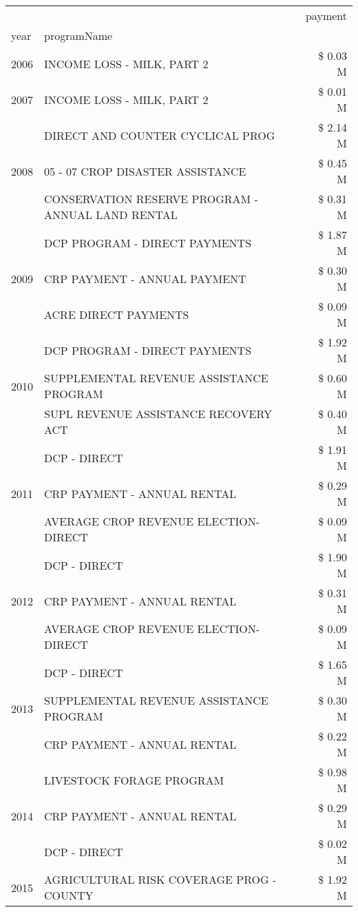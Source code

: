 \begin{tabular}{llr}
\toprule
 &  & payment \\
year & programName &  \\
\midrule
2006 & INCOME LOSS - MILK, PART 2 & \$ 0.03 M \\
\cline{1-3}
2007 & INCOME LOSS - MILK, PART 2 & \$ 0.01 M \\
\cline{1-3}
\multirow[t]{3}{*}{2008} & DIRECT AND COUNTER CYCLICAL PROG & \$ 2.14 M \\
 & 05 - 07 CROP DISASTER ASSISTANCE & \$ 0.45 M \\
 & CONSERVATION RESERVE PROGRAM - ANNUAL LAND RENTAL & \$ 0.31 M \\
\cline{1-3}
\multirow[t]{3}{*}{2009} & DCP PROGRAM - DIRECT PAYMENTS & \$ 1.87 M \\
 & CRP PAYMENT - ANNUAL PAYMENT & \$ 0.30 M \\
 & ACRE DIRECT PAYMENTS & \$ 0.09 M \\
\cline{1-3}
\multirow[t]{3}{*}{2010} & DCP PROGRAM - DIRECT PAYMENTS & \$ 1.92 M \\
 & SUPPLEMENTAL REVENUE ASSISTANCE PROGRAM & \$ 0.60 M \\
 & SUPL REVENUE ASSISTANCE RECOVERY ACT & \$ 0.40 M \\
\cline{1-3}
\multirow[t]{3}{*}{2011} & DCP - DIRECT & \$ 1.91 M \\
 & CRP PAYMENT - ANNUAL RENTAL & \$ 0.29 M \\
 & AVERAGE CROP REVENUE ELECTION-DIRECT & \$ 0.09 M \\
\cline{1-3}
\multirow[t]{3}{*}{2012} & DCP - DIRECT & \$ 1.90 M \\
 & CRP PAYMENT - ANNUAL RENTAL & \$ 0.31 M \\
 & AVERAGE CROP REVENUE ELECTION-DIRECT & \$ 0.09 M \\
\cline{1-3}
\multirow[t]{3}{*}{2013} & DCP - DIRECT & \$ 1.65 M \\
 & SUPPLEMENTAL REVENUE ASSISTANCE PROGRAM & \$ 0.30 M \\
 & CRP PAYMENT - ANNUAL RENTAL & \$ 0.22 M \\
\cline{1-3}
\multirow[t]{3}{*}{2014} & LIVESTOCK FORAGE PROGRAM & \$ 0.98 M \\
 & CRP PAYMENT - ANNUAL RENTAL & \$ 0.29 M \\
 & DCP - DIRECT & \$ 0.02 M \\
\cline{1-3}
\multirow[t]{3}{*}{2015} & AGRICULTURAL RISK COVERAGE PROG - COUNTY & \$ 1.92 M \\

\end{tabular}
